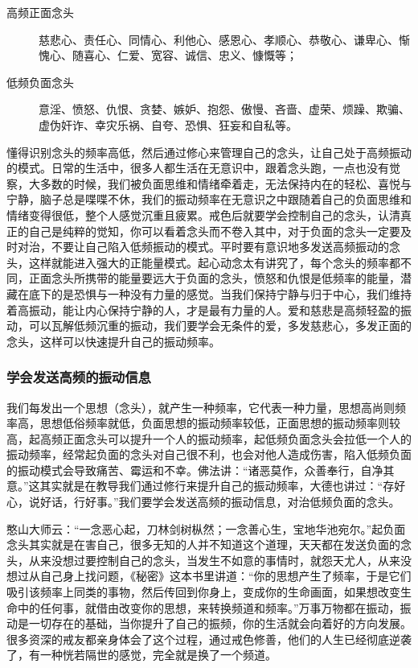 \begin{multicols}{2}
    \begin{description}
        \item[高频正面念头] 慈悲心、责任心、同情心、利他心、感恩心、孝顺心、恭敬心、谦卑心、惭愧心、随喜心、仁爱、宽容、诚信、忠义、慷慨等；
        \item[低频负面念头] 意淫、愤怒、仇恨、贪婪、嫉妒、抱怨、傲慢、吝啬、虚荣、烦躁、欺骗、虚伪奸诈、幸灾乐祸、自夸、恐惧、狂妄和自私等。
    \end{description}
\end{multicols}

懂得识别念头的频率高低，然后通过修心来管理自己的念头，让自己处于高频振动的模式。日常的生活中，很多人都生活在无意识中，跟着念头跑，一点也没有觉察，大多数的时候，我们被负面思维和情绪牵着走，无法保持内在的轻松、喜悦与宁静，脑子总是喋喋不休，我们的振动频率在无意识之中跟随着自己的负面思维和情绪变得很低，整个人感觉沉重且疲累。戒色后就要学会控制自己的念头，认清真正的自己是纯粹的觉知，你可以看着念头而不卷入其中，对于负面的念头一定要及时对治，不要让自己陷入低频振动的模式。平时要有意识地多发送高频振动的念头，这样就能进入强大的正能量模式。起心动念太有讲究了，每个念头的频率都不同，正面念头所携带的能量要远大于负面的念头，愤怒和仇恨是低频率的能量，潜藏在底下的是恐惧与一种没有力量的感觉。当我们保持宁静与归于中心，我们维持着高振动，能让内心保持宁静的人，才是最有力量的人。爱和慈悲是高频轻盈的振动，可以瓦解低频沉重的振动，我们要学会无条件的爱，多发慈悲心，多发正面的念头，这样可以快速提升自己的振动频率。

\subsubsection{学会发送高频的振动信息}

我们每发出一个思想（念头），就产生一种频率，它代表一种力量，思想高尚则频率高，思想低俗频率就低，负面思想的振动频率较低，正面思想的振动频率则较高，起高频正面念头可以提升一个人的振动频率，起低频负面念头会拉低一个人的振动频率，经常起负面的念头对自己很不利，也会对他人造成伤害，陷入低频负面的振动模式会导致痛苦、霉运和不幸。佛法讲：“诸恶莫作，众善奉行，自净其意。”这其实就是在教导我们通过修行来提升自己的振动频率，大德也讲过：“存好心，说好话，行好事。”我们要学会发送高频的振动信息，对治低频负面的念头。

憨山大师云：“一念恶心起，刀林剑树枞然；一念善心生，宝地华池宛尔。”起负面念头其实就是在害自己，很多无知的人并不知道这个道理，天天都在发送负面的念头，从来没想过要控制自己的念头，当发生不如意的事情时，就怨天尤人，从来没想过从自己身上找问题，《秘密》这本书里讲道：“你的思想产生了频率，于是它们吸引该频率上同类的事物，然后传回到你身上，变成你的生命画面，如果想改变生命中的任何事，就借由改变你的思想，来转换频道和频率。”万事万物都在振动，振动是一切存在的基础，当你提升了自己的振频，你的生活就会向着好的方向发展。很多资深的戒友都亲身体会了这个过程，通过戒色修善，他们的人生已经彻底逆袭了，有一种恍若隔世的感觉，完全就是换了一个频道。

